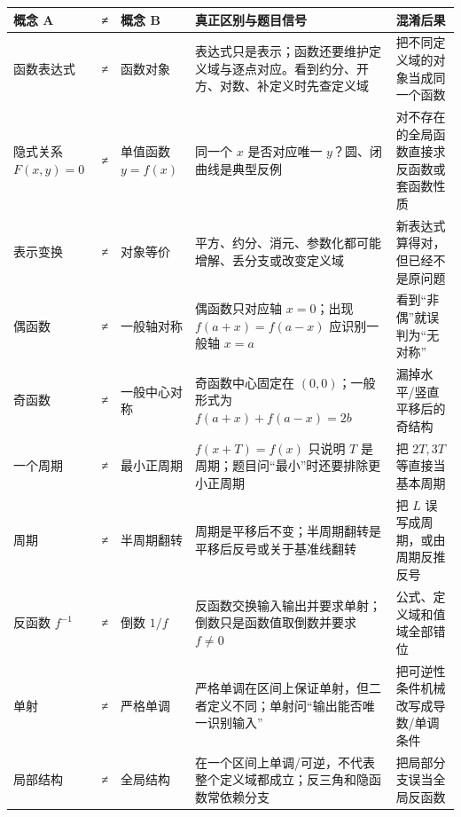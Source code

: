\documentclass[11pt,a4paper]{ctexart}
\newcounter{none}
\begin{document}
{\def\LTcaptype{none} %
\begin{longtable}[]{@{}
  >{\raggedright\arraybackslash}p{}
  >{\centering\arraybackslash}p{}
  >{\raggedright\arraybackslash}p{}
  >{\raggedright\arraybackslash}p{}
  >{\raggedright\arraybackslash}p{}@{}}
\toprule\noalign{}
\begin{minipage}[b]{\linewidth}\raggedright
概念 A
\end{minipage} & \begin{minipage}[b]{\linewidth}\centering
≠
\end{minipage} & \begin{minipage}[b]{\linewidth}\raggedright
概念 B
\end{minipage} & \begin{minipage}[b]{\linewidth}\raggedright
真正区别与题目信号
\end{minipage} & \begin{minipage}[b]{\linewidth}\raggedright
混淆后果
\end{minipage} \\
\midrule\noalign{}
\endhead
\bottomrule\noalign{}
\endlastfoot
函数表达式 & ≠ & 函数对象 &
表达式只是表示；函数还要维护定义域与逐点对应。看到约分、开方、对数、补定义时先查定义域
& 把不同定义域的对象当成同一个函数 \\
隐式关系 \(F(x,y)=0\) & ≠ & 单值函数 \(y=f(x)\) & 同一个 \(x\)
是否对应唯一 \(y\)？圆、闭曲线是典型反例 &
对不存在的全局函数直接求反函数或套函数性质 \\
表示变换 & ≠ & 对象等价 &
平方、约分、消元、参数化都可能增解、丢分支或改变定义域 &
新表达式算得对，但已经不是原问题 \\
偶函数 & ≠ & 一般轴对称 & 偶函数只对应轴 \(x=0\)；出现 \(f(a+x)=f(a-x)\)
应识别一般轴 \(x=a\) & 看到``非偶''就误判为``无对称'' \\
奇函数 & ≠ & 一般中心对称 & 奇函数中心固定在 \((0,0)\)；一般形式为
\(f(a+x)+f(a-x)=2b\) & 漏掉水平/竖直平移后的奇结构 \\
一个周期 & ≠ & 最小正周期 & \(f(x+T)=f(x)\) 只说明 \(T\)
是周期；题目问``最小''时还要排除更小正周期 & 把 \(2T,3T\)
等直接当基本周期 \\
周期 & ≠ & 半周期翻转 &
周期是平移后不变；半周期翻转是平移后反号或关于基准线翻转 & 把 \(L\)
误写成周期，或由周期反推反号 \\
反函数 \(f^{-1}\) & ≠ & 倒数 \(1/f\) &
反函数交换输入输出并要求单射；倒数只是函数值取倒数并要求 \(f\ne0\) &
公式、定义域和值域全部错位 \\
单射 & ≠ & 严格单调 &
严格单调在区间上保证单射，但二者定义不同；单射问``输出能否唯一识别输入''
& 把可逆性条件机械改写成导数/单调条件 \\
局部结构 & ≠ & 全局结构 &
在一个区间上单调/可逆，不代表整个定义域都成立；反三角和隐函数常依赖分支
& 把局部分支误当全局反函数 \\
\end{longtable}
}
\end{document}
